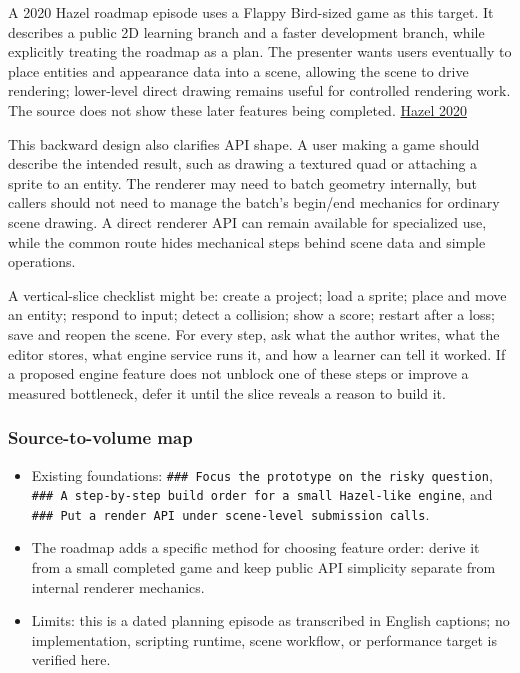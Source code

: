 A 2020 Hazel roadmap episode uses a Flappy Bird-sized game as this target. It describes a public 2D learning branch and a faster development branch, while explicitly treating the roadmap as a plan. The presenter wants users eventually to place entities and appearance data into a scene, allowing the scene to drive rendering; lower-level direct drawing remains useful for controlled rendering work. The source does not show these later features being completed. \href{https://www.youtube.com/watch?v=6BHhNELSnDU}{Hazel 2020}

This backward design also clarifies API shape. A user making a game should describe the intended result, such as drawing a textured quad or attaching a sprite to an entity. The renderer may need to batch geometry internally, but callers should not need to manage the batch's begin/end mechanics for ordinary scene drawing. A direct renderer API can remain available for specialized use, while the common route hides mechanical steps behind scene data and simple operations.

A vertical-slice checklist might be: create a project; load a sprite; place and move an entity; respond to input; detect a collision; show a score; restart after a loss; save and reopen the scene. For every step, ask what the author writes, what the editor stores, what engine service runs it, and how a learner can tell it worked. If a proposed engine feature does not unblock one of these steps or improve a measured bottleneck, defer it until the slice reveals a reason to build it.

\subsubsection{Source-to-volume map}\label{05-engine-i-ch013-source-to-volume-map}

\begin{itemize}
\tightlist
\item
  Existing foundations: \texttt{\#\#\#\ Focus\ the\ prototype\ on\ the\ risky\ question}, \texttt{\#\#\#\ A\ step-by-step\ build\ order\ for\ a\ small\ Hazel-like\ engine}, and \texttt{\#\#\#\ Put\ a\ render\ API\ under\ scene-level\ submission\ calls}.
\item
  The roadmap adds a specific method for choosing feature order: derive it from a small completed game and keep public API simplicity separate from internal renderer mechanics.
\item
  Limits: this is a dated planning episode as transcribed in English captions; no implementation, scripting runtime, scene workflow, or performance target is verified here.
\end{itemize}


